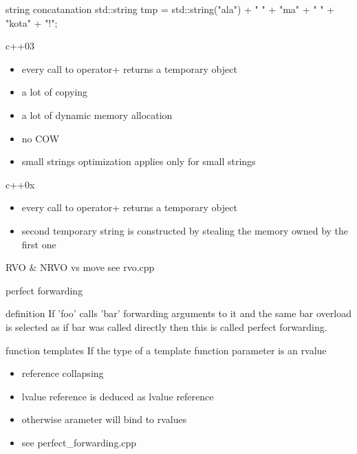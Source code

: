 \documentclass{beamer}
\begin{document}
\begin{frame}{string concatanation}
  std::string tmp = std::string("ala") + " " + "ma" + " " + "kota" + "!";
  \begin{block}{c++03}
    \begin{itemize}
    \item every call to operator+ returns a temporary object
    \item a lot of copying
    \item a lot of dynamic memory allocation
    \item no COW
    \item small strings optimization applies only for small strings
    \end{itemize}
  \end{block}

  \begin{block}{c++0x}
    \begin{itemize}
    \item every call to operator+ returns a temporary object
    \item second temporary string is constructed by stealing the memory owned by the first one
    \end{itemize}
  \end{block}
\end{frame}

\begin{frame}{RVO \& NRVO vs move}
  see rvo.cpp
\end{frame}

\begin{frame}{perfect forwarding}
  \begin{block}{definition}
    If 'foo' calls 'bar' forwarding arguments to it and the same bar
    overload is selected as if bar was called directly then this is
    called perfect forwarding.
  \end{block}
  \begin{block}{function templates}
    If the type of a template function parameter is an rvalue
    \begin{itemize}
    \item reference collapsing
    \item lvalue reference is deduced as lvalue reference
    \item otherwise arameter will bind to rvalues
    \item see perfect\_forwarding.cpp
    \end{itemize}
  \end{block}
\end{frame}
\end{document}

